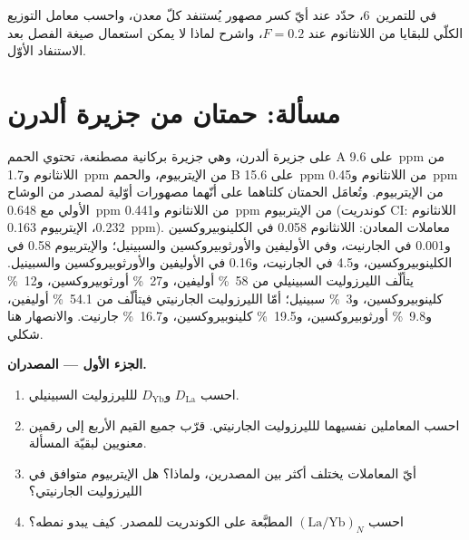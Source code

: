\begin{exercise}[$\star\star\star$]\label{exo:b3:trace-element-modelling:12}
في  للتمرين~6، حدّد عند أيّ كسر مصهور يُستنفد كلّ معدن،
واحسب معامل التوزيع الكلّي للبقايا من اللانثانوم عند
$F = 0.2$، واشرح لماذا لا يمكن استعمال صيغة الفصل بعد
الاستنفاد الأوّل.
\end{exercise}

\section{مسألة: حمتان من جزيرة ألدرن}

\begin{problem}\label{pb:b3:trace-element-modelling:1}
على جزيرة ألدرن، وهي جزيرة بركانية مصطنعة، تحتوي الحمم A على
\qty{9.6}{ppm} من اللانثانوم و\qty{1.7}{ppm} من الإيتربيوم، والحمم B على \qty{15.6}{ppm} من اللانثانوم و\qty{0.45}{ppm} من الإيتربيوم.
وتُعامَل الحمتان كلتاهما على أنّهما مصهورات أوّلية لمصدر من الوشاح الأولي مع
\qty{0.648}{ppm} من اللانثانوم و\qty{0.441}{ppm} من الإيتربيوم (كوندريت CI: اللانثانوم 0.232، الإيتربيوم
\qty{0.163}{ppm}). معاملات المعادن: اللانثانوم 0.058 في الكلينوبيروكسين و0.001
في الجارنيت، وفي الأوليفين والأورثوبيروكسين والسبينيل؛ والإيتربيوم 0.58 في
الكلينوبيروكسين، و4.5 في الجارنيت، و0.16 في الأوليفين والأورثوبيروكسين والسبينيل.
يتألّف الليرزوليت السبينيلي من \qty{58}{\percent} أوليفين، و\qty{27}{\percent} أورثوبيروكسين، و\qty{12}{\percent}
كلينوبيروكسين، و\qty{3}{\percent} سبينيل؛ أمّا الليرزوليت الجارنيتي فيتألّف من \qty{54.1}{\percent} أوليفين، و\qty{9.8}{\percent}
أورثوبيروكسين، و\qty{19.5}{\percent} كلينوبيروكسين، و\qty{16.7}{\percent} جارنيت. والانصهار هنا شكلي.

\medskip\noindent\textbf{الجزء الأول --- المصدران.}
\begin{enumerate}
\item احسب $D_{\mathrm{La}}$ و$D_{\mathrm{Yb}}$ للليرزوليت السبينيلي.
\item احسب المعاملين نفسيهما للليرزوليت الجارنيتي. قرّب جميع القيم الأربع إلى رقمين
معنويين لبقيّة المسألة.
\item أيّ المعاملات يختلف أكثر بين المصدرين، ولماذا؟ هل
الإيتربيوم متوافق في الليرزوليت الجارنيتي؟
\item احسب $(\mathrm{La}/\mathrm{Yb})_N$ المطبَّعة على الكوندريت
للمصدر. كيف يبدو نمطه؟
\end{enumerate}


\end{problem}
